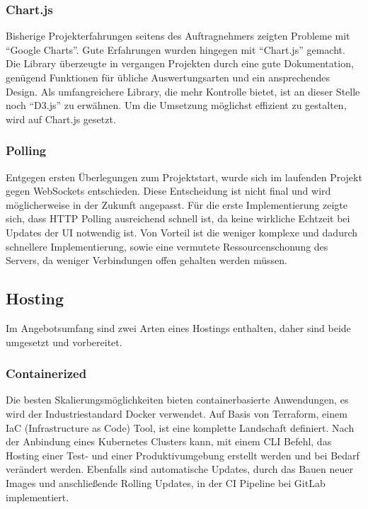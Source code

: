 \subsubsection{Chart.js}
Bisherige Projekterfahrungen seitens des Auftragnehmers zeigten Probleme mit \enquote{Google Charts}.
Gute Erfahrungen wurden hingegen mit \enquote{Chart.js} gemacht.
Die Library überzeugte in vergangen Projekten durch eine gute Dokumentation, genügend Funktionen für übliche Auswertungsarten und ein ansprechendes Design.
Als umfangreichere Library, die mehr Kontrolle bietet, ist an dieser Stelle noch \enquote{D3.js} zu erwähnen.
Um die Umsetzung möglichst effizient zu gestalten, wird auf Chart.js gesetzt.

\subsubsection{Polling}
Entgegen ersten Überlegungen zum Projektstart, wurde sich im laufenden Projekt gegen WebSockets entschieden.
Diese Entscheidung ist nicht final und wird möglicherweise in der Zukunft angepasst.
Für die erste Implementierung zeigte sich, dass HTTP Polling ausreichend schnell ist, da keine wirkliche Echtzeit bei Updates der UI notwendig ist.
Von Vorteil ist die weniger komplexe und dadurch schnellere Implementierung, sowie eine vermutete Ressourcenschonung des Servers, da weniger Verbindungen offen gehalten werden müssen.

\subsection{Hosting}
Im Angebotsumfang sind zwei Arten eines Hostings enthalten, daher sind beide umgesetzt und vorbereitet.

\subsubsection{Containerized}
Die besten Skalierungsmöglichkeiten bieten containerbasierte Anwendungen, es wird der Industriestandard Docker verwendet.
Auf Basis von Terraform, einem IaC (Infrastructure as Code) Tool, ist eine komplette Landschaft definiert.
Nach der Anbindung eines Kubernetes Clusters kann, mit einem CLI Befehl, das Hosting einer Test- und einer Produktivumgebung erstellt werden und bei Bedarf verändert werden.
Ebenfalls sind automatische Updates, durch das Bauen neuer Images und anschließende Rolling Updates, in der CI Pipeline bei GitLab implementiert.
\newpage


